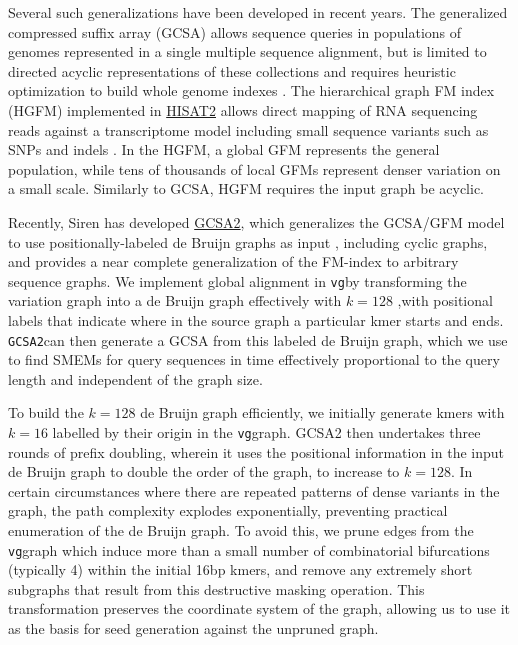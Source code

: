 \documentclass[12pt]{article}
\newcommand{\vg}{{\tt vg}}
\newcommand{\gcsa}{{\tt GCSA2}}
\begin{document}
Several such generalizations have been developed in recent years.
The generalized compressed suffix array (GCSA) allows sequence queries in populations of genomes represented in a single multiple sequence alignment, but is limited to directed acyclic representations of these collections and requires heuristic optimization to build whole genome indexes \cite{siren2011indexing, siren2014indexing}.
The hierarchical graph FM index (HGFM) implemented in \href{https://github.com/infphilo/hisat2}{HISAT2} allows direct mapping of RNA sequencing reads against a transcriptome model including small sequence variants such as SNPs and indels \cite{kim2015hisat}.
In the HGFM, a global GFM represents the general population, while tens of thousands of local GFMs represent denser variation on a small scale.
Similarly to GCSA, HGFM requires the input graph be acyclic.

Recently, Siren has developed \href{https://github.com/jltsiren/gcsa2}{GCSA2}, which generalizes the GCSA/GFM model to use positionally-labeled de Bruijn graphs as input \cite{siren2016gcsa2}, including cyclic graphs, and provides a near complete generalization of the FM-index to arbitrary sequence graphs.
We implement global alignment in \vg by transforming the variation graph into a de Bruijn graph effectively with $k=128$ ,with positional labels that indicate where in the source graph a particular kmer starts and ends.  \gcsa can then generate a GCSA from this labeled de Bruijn graph, which we use to find SMEMs for query sequences in time effectively proportional to the query length and independent of the graph size.

To build the $k=128$ de Bruijn graph efficiently, we initially generate kmers with $k=16$ labelled by their origin in the \vg graph.  GCSA2 then undertakes three rounds of prefix doubling, wherein it uses the positional information in the input de Bruijn graph to double the order of the graph, to increase to $k=128$.  In certain circumstances where there are repeated patterns of dense variants in the graph, the path complexity explodes exponentially, preventing practical enumeration of the de Bruijn graph.  To avoid this, we 
prune edges from the \vg graph which induce more than a small number of combinatorial bifurcations (typically 4) within the initial 16bp kmers, and remove any extremely short subgraphs that result from this destructive masking operation.  This transformation preserves the coordinate system of the graph, allowing us to use it as the basis for seed generation against the unpruned graph.
\end{document}
